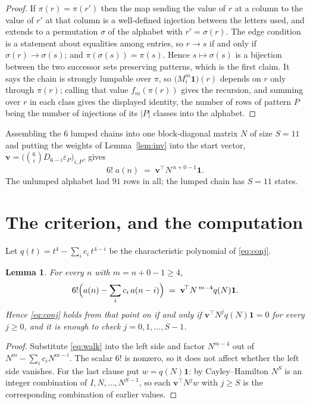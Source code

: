 \documentclass[11pt,a4paper]{article}
\theoremstyle{plain}
\newtheorem{lemma}[theorem]{Lemma}
\theoremstyle{definition}
\begin{document}
\begin{proof}
If $\pi(r)=\pi(r')$ then the map sending the value of $r$ at a column to the value of $r'$
at that column is a well-defined injection between the letters used, and extends to a
permutation $\sigma$ of the alphabet with $r'=\sigma(r)$. The edge condition is a statement
about equalities among entries, so $r\to s$ if and only if $\sigma(r)\to\sigma(s)$; and
$\pi(\sigma(s))=\pi(s)$. Hence $s\mapsto\sigma(s)$ is a bijection between the two successor
sets preserving patterns, which is the first claim. It says the chain is strongly lumpable
over $\pi$, so $\bigl(M_i^{m}\mathbf{1}\bigr)(r)$ depends on $r$ only through $\pi(r)$;
calling that value $f_m(\pi(r))$ gives the recursion, and summing over $r$ in each class
gives the displayed identity, the number of rows of pattern $P$ being the number of
injections of its $|P|$ classes into the alphabet.
\end{proof}

Assembling the $6$ lumped chains into one block-diagonal matrix $N$ of size $S=11$ and
putting the weights of Lemma~\ref{lem:inv} into the start vector,
$\mathbf{v}=\bigl(\binom{6}{i}D_{6-i}\varepsilon_P\bigr)_{i,P}$, gives
\begin{equation}\label{eq:walk}
6!\;a(n)\;=\;\mathbf{v}^{\!\top}N^{\,n+0-1}\mathbf{1} .
\end{equation}
The unlumped alphabet had $91$ rows in all; the lumped chain has $S=11$ states.

\section{The criterion, and the computation}

Let $q(t)=t^{4}-\sum_i c_i\,t^{4-i}$ be the characteristic polynomial of
\eqref{eq:conj}.

\begin{lemma}\label{lem:crit}
For every $n$ with $m=n+0-1\ge4$,
\[
6!\Bigl(a(n)-\sum_i c_i\,a(n-i)\Bigr)\;=\;\mathbf{v}^{\!\top}N^{\,m-4}q(N)\mathbf{1} .
\]
Hence \eqref{eq:conj} holds from that point on if and only if
$\mathbf{v}^{\!\top}N^{j}q(N)\mathbf{1}=0$ for every $j\ge0$, and it is enough to check
$j=0,1,\dots,S-1$.
\end{lemma}

\begin{proof}
Substitute \eqref{eq:walk} into the left side and factor $N^{m-4}$ out of
$N^{m}-\sum_i c_iN^{m-i}$. The scalar $6!$ is nonzero, so it does not affect whether
the left side vanishes. For the last clause put $w=q(N)\mathbf{1}$: by Cayley--Hamilton
$N^{S}$ is an integer combination of $I,N,\dots,N^{S-1}$, so each
$\mathbf{v}^{\!\top}N^{j}w$ with $j\ge S$ is the corresponding combination of earlier
values.
\end{proof}
\end{document}
